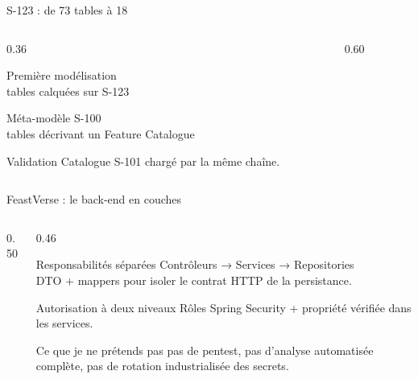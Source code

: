 \begin{frame}{S-123 : de 73 tables à 18}
\begin{columns}[T]
\begin{column}{0.36\linewidth}
\begin{block}{Première modélisation}
\\[-0.1em]\scriptsize tables calquées sur S-123
\end{block}
\begin{block}{Méta-modèle S-100}
\\[-0.1em]\scriptsize tables décrivant un Feature Catalogue
\end{block}
\begin{block}{Validation}
\centering\small Catalogue S-101 chargé par la même chaîne.
\end{block}
\end{column}
\begin{column}{0.60\linewidth}
\centering
{}
\vspace{0.2em}
\scriptsize{}
\end{column}
\end{columns}
\end{frame}

\begin{frame}{FeastVerse : le back-end en couches}
\begin{columns}[T]
\begin{column}{0.50\linewidth}
\centering
{}
\end{column}
\begin{column}{0.46\linewidth}
\begin{block}{Responsabilités séparées}
\small Contrôleurs → Services → Repositories\\DTO + mappers pour isoler le contrat HTTP de la persistance.
\end{block}
\begin{block}{Autorisation à deux niveaux}
\small Rôles Spring Security + propriété vérifiée dans les services.
\end{block}
\begin{block}{Ce que je ne prétends pas}
\small{} pas de pentest, pas d'analyse automatisée complète, pas de rotation industrialisée des secrets.
\end{block}
\end{column}
\end{columns}
\end{frame}

